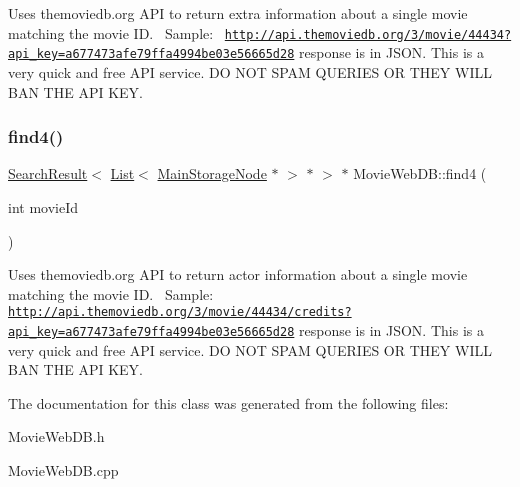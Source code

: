 Uses themoviedb.\+org A\+PI to return extra information about a single movie matching the movie ID.~\newline
Sample\+:~\newline
\href{http://api.themoviedb.org/3/movie/44434?api_key=a677473afe79ffa4994be03e56665d28}{\tt http\+://api.\+themoviedb.\+org/3/movie/44434?api\+\_\+key=a677473afe79ffa4994be03e56665d28} response is in J\+S\+ON. This is a very quick and free A\+PI service. DO N\+OT S\+P\+AM Q\+U\+E\+R\+I\+ES OR T\+H\+EY W\+I\+LL B\+AN T\+HE A\+PI K\+EY. \mbox{\label{class_movie_web_d_b_a3c6ba36eea86b1d5138f639662927981}} 
\subsubsection{\texorpdfstring{find4()}{find4()}}
{\footnotesize\ttfamily \hyperlink{class_search_result}{Search\+Result}$<$ \hyperlink{class_list}{List}$<$ \hyperlink{class_main_storage_node}{Main\+Storage\+Node} $\ast$ $>$ $\ast$ $>$ $\ast$ Movie\+Web\+D\+B\+::find4 (\begin{DoxyParamCaption}\item[{int}]{movie\+Id }\end{DoxyParamCaption})\hspace{0.3cm}{\ttfamily [static]}}

Uses themoviedb.\+org A\+PI to return actor information about a single movie matching the movie ID.~\newline
Sample\+:~\newline
\href{http://api.themoviedb.org/3/movie/44434/credits?api_key=a677473afe79ffa4994be03e56665d28}{\tt http\+://api.\+themoviedb.\+org/3/movie/44434/credits?api\+\_\+key=a677473afe79ffa4994be03e56665d28} response is in J\+S\+ON. This is a very quick and free A\+PI service. DO N\+OT S\+P\+AM Q\+U\+E\+R\+I\+ES OR T\+H\+EY W\+I\+LL B\+AN T\+HE A\+PI K\+EY. 

The documentation for this class was generated from the following files\+:\begin{DoxyCompactItemize}
\item 
Movie\+Web\+D\+B.\+h\item 
Movie\+Web\+D\+B.\+cpp\end{DoxyCompactItemize}
